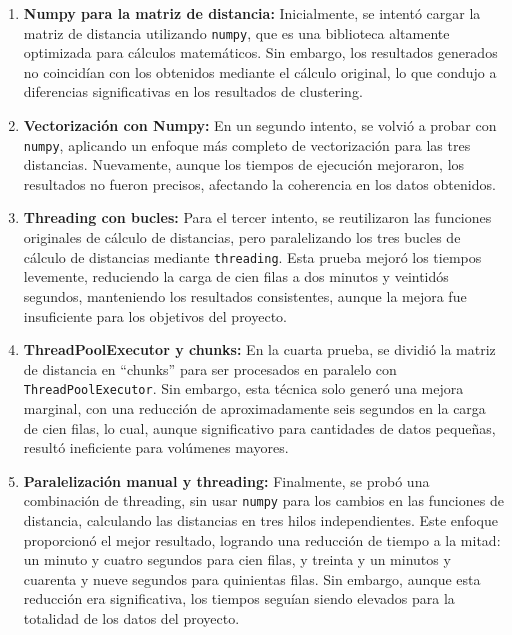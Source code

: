 \begin{enumerate}
    \item \textbf{Numpy para la matriz de distancia:} Inicialmente, se intentó cargar la matriz de distancia utilizando \texttt{numpy}, que es una biblioteca altamente optimizada para cálculos matemáticos. Sin embargo, los resultados generados no coincidían con los obtenidos mediante el cálculo original, lo que condujo a diferencias significativas en los resultados de clustering.

    \item \textbf{Vectorización con Numpy:} En un segundo intento, se volvió a probar con \texttt{numpy}, aplicando un enfoque más completo de vectorización para las tres distancias. Nuevamente, aunque los tiempos de ejecución mejoraron, los resultados no fueron precisos, afectando la coherencia en los datos obtenidos.

    \item \textbf{Threading con bucles:} Para el tercer intento, se reutilizaron las funciones originales de cálculo de distancias, pero paralelizando los tres bucles de cálculo de distancias mediante \texttt{threading}. Esta prueba mejoró los tiempos levemente, reduciendo la carga de cien filas a dos minutos y veintidós segundos, manteniendo los resultados consistentes, aunque la mejora fue insuficiente para los objetivos del proyecto.

    \item \textbf{ThreadPoolExecutor y chunks:} En la cuarta prueba, se dividió la matriz de distancia en “chunks” para ser procesados en paralelo con \texttt{ThreadPoolExecutor}. Sin embargo, esta técnica solo generó una mejora marginal, con una reducción de aproximadamente seis segundos en la carga de cien filas, lo cual, aunque significativo para cantidades de datos pequeñas, resultó ineficiente para volúmenes mayores.

    \item \textbf{Paralelización manual y threading:} Finalmente, se probó una combinación de threading, sin usar \texttt{numpy} para los cambios en las funciones de distancia, calculando las distancias en tres hilos independientes. Este enfoque proporcionó el mejor resultado, logrando una reducción de tiempo a la mitad: un minuto y cuatro segundos para cien filas, y treinta y un minutos y cuarenta y nueve segundos para quinientas filas. Sin embargo, aunque esta reducción era significativa, los tiempos seguían siendo elevados para la totalidad de los datos del proyecto.
\end{enumerate}

